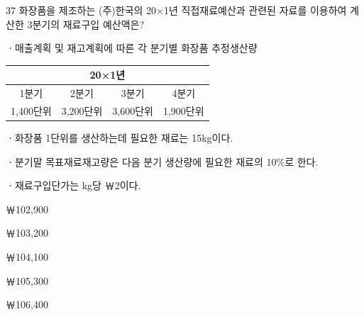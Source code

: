 \begin{question}{37}
화장품을 제조하는 (주)한국의 20×1년 직접재료예산과 관련된 자료를 이용하여 계산한 3분기의 재료구입 예산액은?
\begin{framedtext}
ㆍ매출계획 및 재고계획에 따른 각 분기별 화장품 추정생산량 \par
\begin{center}\small
\begin{tabular}{|c|c|c|c|}
\hline
\multicolumn{4}{|c|}{20×1년} \\
\hline
1분기 & 2분기 & 3분기 & 4분기 \\
\hline
1,400단위 & 3,200단위 & 3,600단위 & 1,900단위 \\
\hline
\end{tabular}
\end{center}
ㆍ화장품 1단위를 생산하는데 필요한 재료는 15kg이다. \par
ㆍ분기말 목표재료재고량은 다음 분기 생산량에 필요한 재료의 10\%로 한다. \par
ㆍ재료구입단가는 kg당 ￦2이다. \par
\end{framedtext}
\begin{choices}
  \item ￦102,900
  \item ￦103,200
  \item ￦104,100
  \item ￦105,300
  \item ￦106,400
\end{choices}
\end{question}
